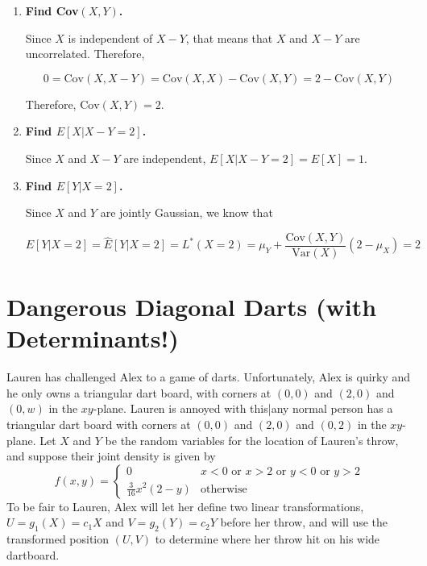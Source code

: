 \documentclass{article}
\begin{document}
\begin{enumerate}[label=(\alph*)]
    \item \textbf{Find Cov$(X, Y)$.}
    
    Since $X$ is independent of $X - Y$, that means that $X$ and $X - Y$ are uncorrelated. Therefore,
    
    $$0 = \text{Cov}(X, X - Y) = \text{Cov}(X, X) - \text{Cov}(X, Y) = 2 - \text{Cov}(X, Y)$$
    
    Therefore, $\boxed{\text{Cov}(X, Y) = 2}$.

    \vspace{2cm}
    
    \item \textbf{Find $E[X \vert X - Y = 2]$.}
    
    Since $X$ and $X - Y$ are independent, $E[X \vert X - Y = 2] = E[X] = \boxed{1}$.

    \vspace{2cm}
    
    \item \textbf{Find $E[Y \vert X = 2]$.}
    
    Since $X$ and $Y$ are jointly Gaussian, we know that
    
    $$E[Y \vert X = 2] = \hat{E}[Y \vert X = 2] = L^*(X = 2) = \mu_Y + \frac{\text{Cov}(X, Y)}{\text{Var}(X)}(2 - \mu_X) = \boxed{2}$$

\end{enumerate}

\newpage

\section{Dangerous Diagonal Darts (with Determinants!)}
Lauren has challenged Alex to a game of darts. Unfortunately, Alex is quirky and he only
owns a triangular dart board, with corners at $(0,0)$ and $(2,0)$ and $(0,w)$ in the $xy$-plane.
Lauren is annoyed with this|any normal person has a triangular dart board with corners at $(0,0)$
and $(2,0)$ and $(0,2)$ in the $xy$-plane. Let $X$ and $Y$ be the random variables for the location
of Lauren's throw, and suppose their joint density is given by
\[
    f(x,y ) = \begin{cases}
        0 & x < 0 \text{ or } x > 2 \text{ or } y < 0 \text{ or } y > 2 \\
        \frac{3}{16}x^2(2-y) & \text{otherwise}
    \end{cases}
\]
To be fair to Lauren, Alex will let her define two linear transformations, $U = g_1(X) = c_1X$
and $V = g_2(Y) = c_2Y$ before her throw, and will use the transformed position $(U,V)$
to determine where her throw hit on his wide dartboard.
\end{document}
